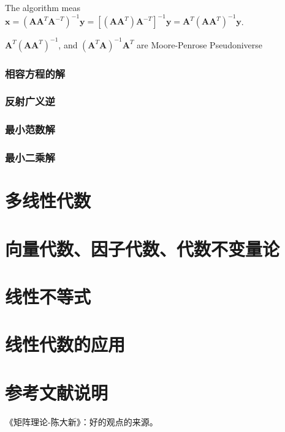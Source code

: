 \documentclass[UTF8]{../../09-Mathematics}
\begin{document}
The algorithm meas $\boldsymbol x = (\boldsymbol A \boldsymbol A^T \boldsymbol A^{-T})^{-1} \boldsymbol y = [(\boldsymbol A \boldsymbol A^T )\boldsymbol A^{-T}]^{-1} \boldsymbol y = \boldsymbol A^T (\boldsymbol A \boldsymbol A^T )^{-1} \boldsymbol y$.

$\boldsymbol A^T (\boldsymbol A \boldsymbol A^T )^{-1}$, and $(\boldsymbol A^T \boldsymbol A )^{-1}\boldsymbol A^T$ are Moore-Penrose Pseudoniverse


\subsection{相容方程的解}
\subsection{反射广义逆}
\subsection{最小范数解}
\subsection{最小二乘解}






\chapter{多线性代数}

\chapter{向量代数、因子代数、代数不变量论}


\chapter{线性不等式}

\chapter{线性代数的应用}




\chapter{参考文献说明}
《矩阵理论-陈大新》：好的观点的来源。


\end{document}
